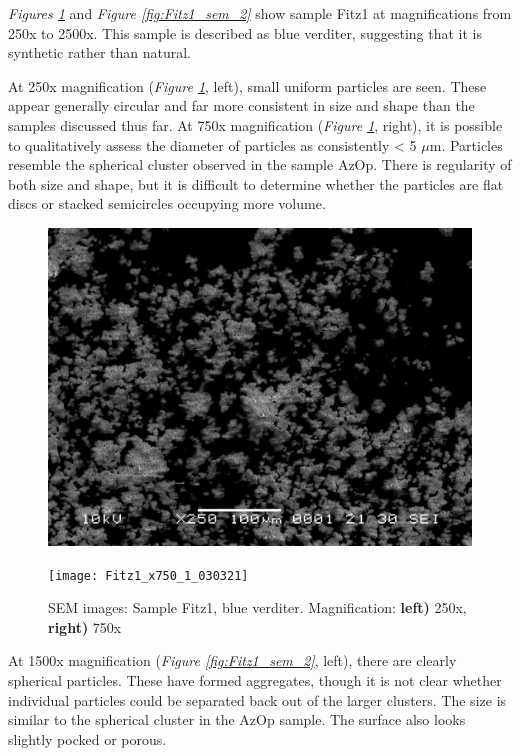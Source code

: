 \textit{Figures \ref{fig:Fitz1_sem_1}} and \textit{Figure \ref{fig:Fitz1_sem_2}} show sample Fitz1 at magnifications from 250x to 2500x. This sample is described as blue verditer, suggesting that it is synthetic rather than natural.

At 250x magnification (\textit{Figure \ref{fig:Fitz1_sem_1}}, left), small uniform particles are seen. These appear generally circular and far more consistent in size and shape than the samples discussed thus far. At 750x magnification (\textit{Figure \ref{fig:Fitz1_sem_1}}, right), it is possible to qualitatively assess the diameter of particles as consistently < 5 $\mu$m. Particles resemble the spherical cluster observed in the sample AzOp. There is regularity of both size and shape, but it is difficult to determine whether the particles are flat discs or stacked semicircles occupying more volume.

\begin{figure}[H]
\centering
\begin{minipage}{.45\textwidth}
  \centering
  \includegraphics[width=\linewidth]{Fitz1_x250_1_030321}
\end{minipage}
\begin{minipage}{.45\textwidth}
  \centering
  \texttt{[image: Fitz1\_x750\_1\_030321]}
\end{minipage}
\caption[SEM images: Sample Fitz1, blue verditer]{SEM images: Sample Fitz1, blue verditer. Magnification: \textbf{left)} 250x, \textbf{right)} 750x}
\label{fig:Fitz1_sem_1}
\end{figure}

At 1500x magnification (\textit{Figure \ref{fig:Fitz1_sem_2}}, left), there are clearly spherical particles. These have formed aggregates, though it is not clear whether individual particles could be separated back out of the larger clusters. The size is similar to the spherical cluster in the AzOp sample. The surface also looks slightly pocked or porous. 

